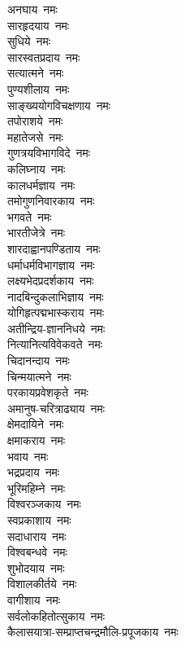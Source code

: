 \begin{multicols}{2}
\begin{flushleft}
अनघाय~नमः\\
सारहृदयाय~नमः\\
सुधिये~नमः\\
सारस्वतप्रदाय~नमः\\
सत्यात्मने~नमः\\
पुण्यशीलाय~नमः\\
साङ्ख्ययोगविचक्षणाय~नमः\\
तपोराशये~नमः\\
महातेजसे~नमः\\
गुणत्रयविभागविदे~नमः\hfill{}\\
                                        
कलिघ्नाय~नमः\\
कालधर्मज्ञाय~नमः\\
तमोगुणनिवारकाय~नमः\\
भगवते~नमः\\
भारतीजेत्रे~नमः\\
शारदाह्वानपण्डिताय~नमः\\
धर्माधर्मविभागज्ञाय~नमः\\
लक्ष्यभेदप्रदर्शकाय~नमः\\
नादबिन्दुकलाभिज्ञाय~नमः\\
योगिहृत्पद्मभास्कराय~नमः\hfill{}\\
                                        
अतीन्द्रिय-ज्ञाननिधये~नमः\\
नित्यानित्यविवेकवते~नमः\\
चिदानन्दाय~नमः\\
चिन्मयात्मने~नमः\\
परकायप्रवेशकृते~नमः\\
अमानुष-चरित्राढ्याय~नमः\\
क्षेमदायिने~नमः\\
क्षमाकराय~नमः\\
भवाय~नमः\\
भद्रप्रदाय~नमः\hfill{}\\
                                        
भूरिमहिम्ने~नमः\\
विश्वरञ्जकाय~नमः\\
स्वप्रकाशाय~नमः\\
सदाधाराय~नमः\\
विश्वबन्धवे~नमः\\
शुभोदयाय~नमः\\
विशालकीर्तये~नमः\\
वागीशाय~नमः\\
सर्वलोकहितोत्सुकाय~नमः\\
कैलासयात्रा-सम्प्राप्त\-चन्द्र\-मौलि-प्रपूजकाय~नमः\hfill{}\\
                                        

\end{flushleft}
\end{multicols}
